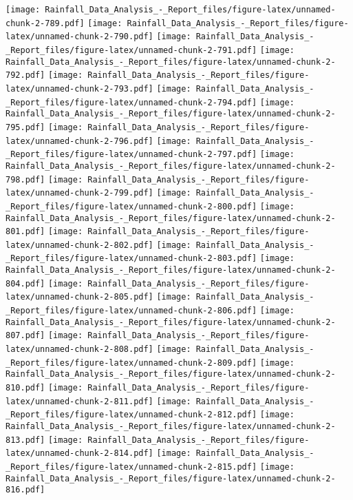 \documentclass[
]{article}
\begin{document}
\texttt{[image: Rainfall\_Data\_Analysis\_-\_Report\_files/figure-latex/unnamed-chunk-2-789.pdf]}
\texttt{[image: Rainfall\_Data\_Analysis\_-\_Report\_files/figure-latex/unnamed-chunk-2-790.pdf]}
\texttt{[image: Rainfall\_Data\_Analysis\_-\_Report\_files/figure-latex/unnamed-chunk-2-791.pdf]}
\texttt{[image: Rainfall\_Data\_Analysis\_-\_Report\_files/figure-latex/unnamed-chunk-2-792.pdf]}
\texttt{[image: Rainfall\_Data\_Analysis\_-\_Report\_files/figure-latex/unnamed-chunk-2-793.pdf]}
\texttt{[image: Rainfall\_Data\_Analysis\_-\_Report\_files/figure-latex/unnamed-chunk-2-794.pdf]}
\texttt{[image: Rainfall\_Data\_Analysis\_-\_Report\_files/figure-latex/unnamed-chunk-2-795.pdf]}
\texttt{[image: Rainfall\_Data\_Analysis\_-\_Report\_files/figure-latex/unnamed-chunk-2-796.pdf]}
\texttt{[image: Rainfall\_Data\_Analysis\_-\_Report\_files/figure-latex/unnamed-chunk-2-797.pdf]}
\texttt{[image: Rainfall\_Data\_Analysis\_-\_Report\_files/figure-latex/unnamed-chunk-2-798.pdf]}
\texttt{[image: Rainfall\_Data\_Analysis\_-\_Report\_files/figure-latex/unnamed-chunk-2-799.pdf]}
\texttt{[image: Rainfall\_Data\_Analysis\_-\_Report\_files/figure-latex/unnamed-chunk-2-800.pdf]}
\texttt{[image: Rainfall\_Data\_Analysis\_-\_Report\_files/figure-latex/unnamed-chunk-2-801.pdf]}
\texttt{[image: Rainfall\_Data\_Analysis\_-\_Report\_files/figure-latex/unnamed-chunk-2-802.pdf]}
\texttt{[image: Rainfall\_Data\_Analysis\_-\_Report\_files/figure-latex/unnamed-chunk-2-803.pdf]}
\texttt{[image: Rainfall\_Data\_Analysis\_-\_Report\_files/figure-latex/unnamed-chunk-2-804.pdf]}
\texttt{[image: Rainfall\_Data\_Analysis\_-\_Report\_files/figure-latex/unnamed-chunk-2-805.pdf]}
\texttt{[image: Rainfall\_Data\_Analysis\_-\_Report\_files/figure-latex/unnamed-chunk-2-806.pdf]}
\texttt{[image: Rainfall\_Data\_Analysis\_-\_Report\_files/figure-latex/unnamed-chunk-2-807.pdf]}
\texttt{[image: Rainfall\_Data\_Analysis\_-\_Report\_files/figure-latex/unnamed-chunk-2-808.pdf]}
\texttt{[image: Rainfall\_Data\_Analysis\_-\_Report\_files/figure-latex/unnamed-chunk-2-809.pdf]}
\texttt{[image: Rainfall\_Data\_Analysis\_-\_Report\_files/figure-latex/unnamed-chunk-2-810.pdf]}
\texttt{[image: Rainfall\_Data\_Analysis\_-\_Report\_files/figure-latex/unnamed-chunk-2-811.pdf]}
\texttt{[image: Rainfall\_Data\_Analysis\_-\_Report\_files/figure-latex/unnamed-chunk-2-812.pdf]}
\texttt{[image: Rainfall\_Data\_Analysis\_-\_Report\_files/figure-latex/unnamed-chunk-2-813.pdf]}
\texttt{[image: Rainfall\_Data\_Analysis\_-\_Report\_files/figure-latex/unnamed-chunk-2-814.pdf]}
\texttt{[image: Rainfall\_Data\_Analysis\_-\_Report\_files/figure-latex/unnamed-chunk-2-815.pdf]}
\texttt{[image: Rainfall\_Data\_Analysis\_-\_Report\_files/figure-latex/unnamed-chunk-2-816.pdf]}
\end{document}
